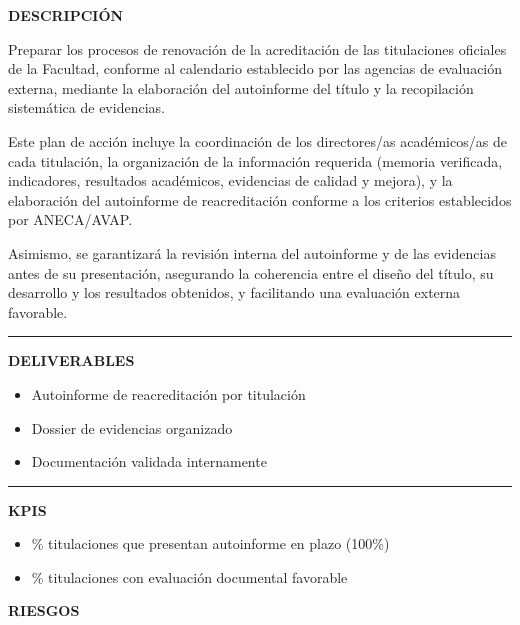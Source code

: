 \documentclass[11pt,a4paper]{scrreprt}
\newcommand{\fieldlabel}[1]{%
  {\footnotesize\sffamily\bfseries\color{mutedcolor}\MakeUppercase{#1}}\par\nopagebreak[4]
}
\newcommand{\fieldsep}{\vspace{3pt}\noindent\textcolor{bordercolor}{\rule{\linewidth}{0.4pt}}\vspace{3pt}\par}
\begin{document}
\begin{tcolorbox}[pabox={aacolor}{PA3.1 \enspace\textbullet\enspace Preparación de los procesos de renovación de la acreditación}]

\fieldlabel{Descripci\'on}
{\small Preparar los procesos de renovación de la acreditación de las titulaciones oficiales de la Facultad, conforme al calendario establecido por las agencias de evaluación externa, mediante la elaboración del autoinforme del título y la recopilación sistemática de evidencias. 

Este plan de acción incluye la coordinación de los directores/as académicos/as de cada titulación, la organización de la información requerida (memoria verificada, indicadores, resultados académicos, evidencias de calidad y mejora), y la elaboración del autoinforme de reacreditación conforme a los criterios establecidos por ANECA/AVAP. 

Asimismo, se garantizará la revisión interna del autoinforme y de las evidencias antes de su presentación, asegurando la coherencia entre el diseño del título, su desarrollo y los resultados obtenidos, y facilitando una evaluación externa favorable. }\par
\fieldsep
\fieldlabel{Deliverables}
{\small \begin{itemize}[noitemsep,topsep=2pt]
\item Autoinforme de reacreditación por titulación
\item Dossier de evidencias organizado
\item Documentación validada internamente
\end{itemize}}\par
\fieldsep
\fieldlabel{KPIs}
{\small \begin{itemize}[noitemsep,topsep=2pt]
\item \% titulaciones que presentan autoinforme en plazo (100\%)
\item \% titulaciones con evaluación documental favorable
\end{itemize}}\par
\end{tcolorbox}
\begin{tcolorbox}[riskbox]
{\footnotesize\sffamily\bfseries\color{red!50!black} RIESGOS}\par{}
\end{tcolorbox}
\end{document}
